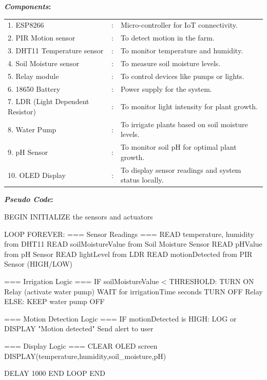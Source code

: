 \textbf{\textit{Components}:}\\[0.5em]
\begin{tabular}{lll}
   1. ESP8266
   &:& Micro-controller for IoT connectivity. \\
   2. PIR Motion sensor
   &:& To detect motion in the farm. \\
   3. DHT11 Temperature sensor
   &:& To monitor temperature and humidity. \\
   4. Soil Moisture sensor
   &:& To measure soil moisture levels. \\
   5. Relay module
   &:& To control devices like pumps or lights. \\
   6. 18650 Battery
   &:& Power supply for the system. \\
   7. LDR (Light Dependent Resistor)
   &:& To monitor light intensity for plant growth. \\
   8. Water Pump
   &:& To irrigate plants based on soil moisture levels. \\
   9. pH Sensor
   &:& To monitor soil pH for optimal plant growth. \\
   10. OLED Display
   &:& To display sensor readings and system status locally. \\
\end{tabular}

\vspace{2em}
\textbf{\textit{Pseudo Code}:}
\begin{pseudocode}   
BEGIN
   INITIALIZE the sensors and actuators

   LOOP FOREVER:
      === Sensor Readings ===
      READ temperature, humidity from DHT11
      READ soilMoistureValue from Soil Moisture Sensor
      READ pHValue from pH Sensor
      READ lightLevel from LDR
      READ motionDetected from PIR Sensor (HIGH/LOW)

      === Irrigation Logic ===
      IF soilMoistureValue < THRESHOLD:
         TURN ON Relay (activate water pump)
         WAIT for irrigationTime seconds
         TURN OFF Relay
      ELSE:
         KEEP water pump OFF

      === Motion Detection Logic ===
      IF motionDetected is HIGH:
         LOG or DISPLAY "Motion detected"
         Send alert to user

      === Display Logic ===
      CLEAR OLED screen
      DISPLAY(temperature,humidity,soil_moisture,pH)

      DELAY 1000
   END LOOP
END
\end{pseudocode}

